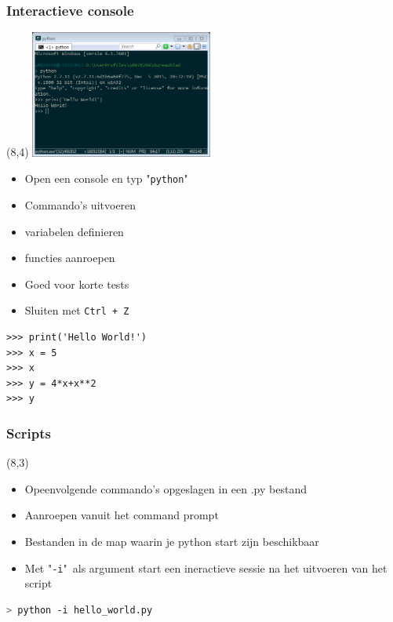 \documentclass[t]{beamer}
\begin{document}
\begin{frame}[fragile]
	\frametitle{Interactieve console}
    \begin{textblock}{6}(8,4)
        \includegraphics[width=6cm]{fig/commandwindow}
    \end{textblock}
    	
    \begin{itemize}
    	\item Open een console en typ "\lstinline{python}"
		\item Commando's uitvoeren
		\item variabelen definieren
		\item functies aanroepen
		\item Goed voor korte tests
		\item Sluiten met \lstinline[language=bash]{Ctrl + Z}
	\end{itemize}
	
    \vspace{2cm}
    
	\begin{lstlisting}
>>> print('Hello World!')
>>> x = 5
>>> x
>>> y = 4*x+x**2
>>> y
	\end{lstlisting}
\end{frame}
\begin{frame}[fragile]
	\frametitle{Scripts}
	\begin{textblock}{6}(8,3)
    \end{textblock}
    
	\begin{itemize}
		\item Opeenvolgende commando's opgeslagen in een .py bestand
		\item Aanroepen vanuit het command prompt
		\item Bestanden in de map waarin je python start zijn beschikbaar
		\item Met "\lstinline[language=bash]{-i}"\ als argument start een ineractieve sessie na het uitvoeren van het script 
	\end{itemize}
	
	\vspace{1cm}
	
	\begin{lstlisting}[language=bash]
> python -i hello_world.py
	\end{lstlisting}
\end{frame}
\end{document}
